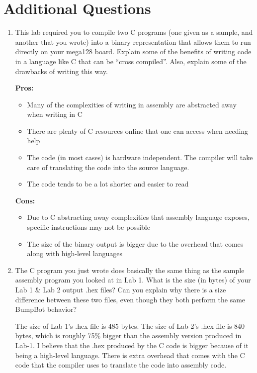 \documentclass[12pt,letterpaper]{article}
\begin{document}
\section{Additional Questions}
\begin{enumerate}
    \item
    This lab required you to compile two C programs (one given as a sample,
    and another that you wrote) into a binary representation that allows them to
    run directly on your mega128 board. 
    Explain some of the benefits of writing code in a language like C that can be “cross compiled”. 
    Also, explain some of the drawbacks of writing this way.

    \textbf{Pros:}
    \begin{itemize}
        \item{Many of the complexities of writing in assembly are abstracted away when writing in C}
        \item{There are plenty of C resources online that one can access when needing help}
        \item{The code (in most cases) is hardware independent. The compiler will take care of translating the code into the source language.}
        \item{The code tends to be a lot shorter and easier to read}
    \end{itemize}
    \textbf{Cons:}
    \begin{itemize}
        \item{Due to C abstracting away complexities that assembly language exposes, specific instructions may not be possible}
        \item{The size of the binary output is bigger due to the overhead that comes along with high-level languages}
    \end{itemize}

    \item
    The C program you just wrote does basically the same thing as the sample
    assembly program you looked at in Lab 1. What is the size (in bytes) of
    your Lab 1 \& Lab 2 output .hex files? 
    Can you explain why there is a size difference between these two files, even though they both perform the same
    BumpBot behavior?

    The size of Lab-1's .hex file is 485 bytes.
    The size of Lab-2's .hex file is 840 bytes, which is roughly 75\% bigger than the assembly version produced in Lab-1.
    I believe that the .hex produced by the C code is bigger because of it being a high-level language.
    There is extra overhead that comes with the C code that the compiler uses to translate the code into assembly code.
    

\end{enumerate}
\end{document}
